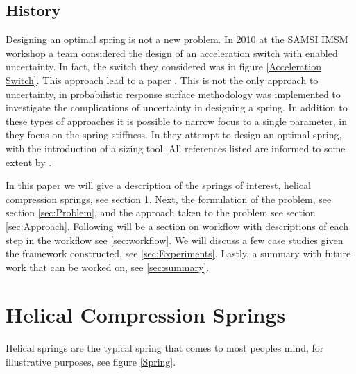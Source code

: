 \documentclass[10pt]{article}
\begin{document}
\subsection{History}
Designing an optimal spring is not a new problem. In 2010 at the SAMSI IMSM workshop a team considered the design of an acceleration switch with enabled uncertainty. In fact, the switch they considered was in figure \ref{Acceleration Switch}. This approach lead to a paper \cite{IMSM2010}. This is not the only approach to uncertainty, in \cite{Reliability} probabilistic response surface methodology was implemented to investigate the complications of uncertainty in designing a spring. In addition to these types of approaches it is possible to narrow focus to a single parameter, in \cite{Robust} they focus on the spring stiffness. In \cite{Paredes} they attempt to design an optimal spring, with the introduction of a sizing tool. All references listed are informed to some extent by \cite{Wahl}. 




In this paper we will give a description of the springs of interest, helical compression springs, see section \ref{sec:Springs}. Next, the formulation of the problem, see section \ref{sec:Problem}, and the approach taken to the problem see section \ref{sec:Approach}. Following will be a section on workflow with descriptions of each step in the workflow see \ref{sec:workflow}. We will discuss a few case studies given the framework constructed, see \ref{sec:Experiments}. Lastly, a summary with future work that can be worked on, see \ref{sec:summary}.





\section{Helical Compression Springs}
\label{sec:Springs}

Helical springs are the typical spring that comes to most peoples mind, for illustrative purposes, see figure \ref{Spring}. 
\end{document}

